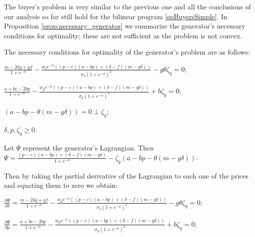 \documentclass[informs]{informs3}
\begin{document}
The buyer's problem is very similar to the previous one and all the conclusions of our analysis so far still hold for the bilinear program \ref{eqBuyersSimple}. In Proposition \ref{prop:necessary_generator} we summarize the generator's necessary conditions for optimality; these are not sufficient as the problem is not convex.



\begin{proposition}\label{prop:necessary_generator}
	The necessary conditions for optimality of the generator's problem are as follows:
	
$\frac{m-2\delta g + g f}{1+e^{-\phi}}-\frac{w_{\delta} e^{-\phi} \left(\left(p-c\right)(a - bp )  +\left(\delta-f\right)(m -g\delta)\right)}{\sigma_{\delta}(1+e^{-\phi})^{2}}-g \theta \zeta_q =0$;


$\frac{a+bc-2bp}{1+e^{-\phi}}-\frac{w_p e^{-\phi} \left(\left(p-c\right)(a - bp )  +\left(\delta-f\right)(m -g\delta)\right)}{\sigma_{p}(1+e^{-\phi})^{2}}+b \zeta_q =0$;

$(a - bp -\theta (m -g\delta)) = 0 \perp \zeta_q$; 

$\delta, p, \zeta_q \geq 0$.
\end{proposition}
%
Let $\Psi$ represent the generator's Lagrangian. Then 
$\Psi =\frac{\left(p-c\right)(a - bp )+\left(\delta-f\right)(m -g\delta)}{1+e^{-\phi}} - \zeta_q(a - bp -\theta (m -g\delta))$. 



Then by taking the partial derivative of the Lagrangian to each one of the prices and equating them to zero we obtain:

$\frac{\partial \Psi}{\partial \delta} = \frac{m-2\delta g + g f}{1+e^{-\phi}}-\frac{w_{\delta} e^{-\phi} \left(\left(p-c\right)(a - bp )  +\left(\delta-f\right)(m -g\delta)\right)}{\sigma_{\delta}(1+e^{-\phi})^{2}}-g \theta \zeta_q =0$;



$\frac{\partial \Psi}{\partial p} = \frac{a+bc-2bp}{1+e^{-\phi}}-\frac{w_p e^{-\phi} \left(\left(p-c\right)(a - bp )  +\left(\delta-f\right)(m -g\delta)\right)}{\sigma_{p}(1+e^{-\phi})^{2}}+b \zeta_q =0$;
\end{document}

